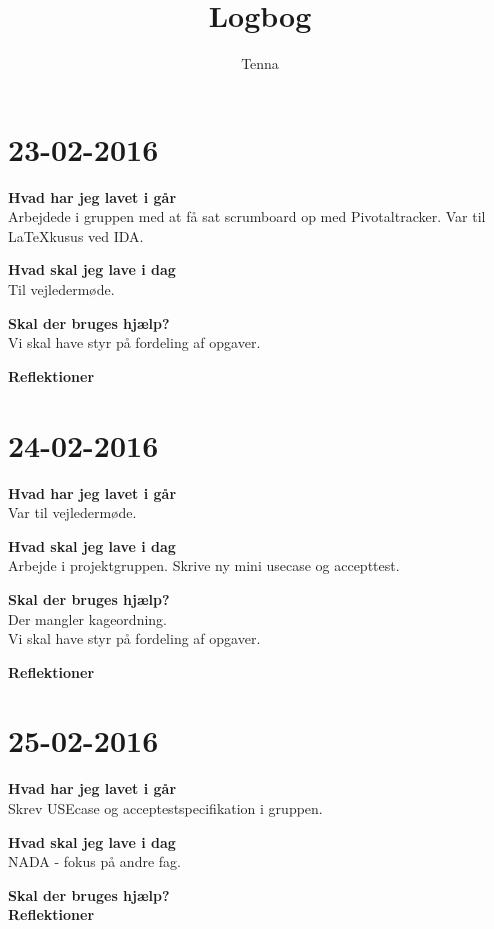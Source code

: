 \documentclass{article}
\title{Logbog}
\author{Tenna}
\date{}
\begin{document}
	\maketitle
	\tableofcontents
	
	\section{23-02-2016}
	
	\textbf{Hvad har jeg lavet i går}\\
	Arbejdede i gruppen med at få sat scrumboard op med Pivotaltracker.
	Var til LaTeXkusus ved IDA.
	
	\textbf{Hvad skal jeg lave i dag}\\
	Til vejledermøde. 
	
	\textbf{Skal der bruges hjælp?}\\
	Vi skal have styr på fordeling af opgaver.
	
	\textbf{Reflektioner}\\
	
	\section{24-02-2016}
		
	\textbf{Hvad har jeg lavet i går}\\
	Var til vejledermøde.
	
	\textbf{Hvad skal jeg lave i dag}\\
	Arbejde i projektgruppen. Skrive ny mini usecase og accepttest. 
		
	\textbf{Skal der bruges hjælp?}\\
	Der mangler kageordning.\\
	Vi skal have styr på fordeling af opgaver.
		
	\textbf{Reflektioner}
	
	
	\section{25-02-2016}
		
	\textbf{Hvad har jeg lavet i går}\\
	Skrev USEcase og acceptestspecifikation i gruppen.
		
	\textbf{Hvad skal jeg lave i dag}\\
	NADA - fokus på andre fag. 
		
	\textbf{Skal der bruges hjælp?}\\
	
	\textbf{Reflektioner}
	
\end{document}
